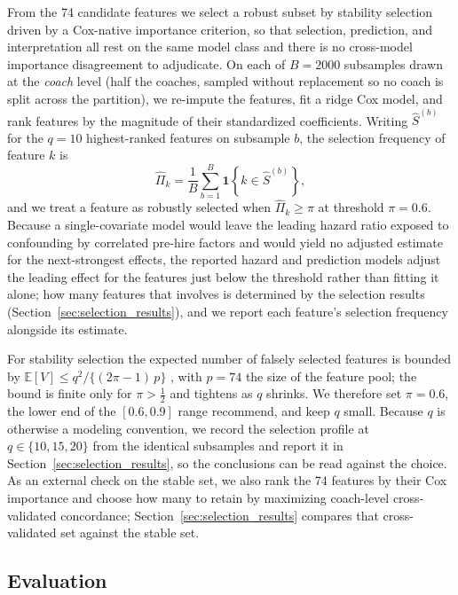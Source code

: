 \documentclass[USenglish]{article}
\theoremstyle{dgthm}
\theoremstyle{dgdef}
\begin{document}
From the 74 candidate features we select a robust subset by stability selection \citep{meinshausen2010} driven by a Cox-native importance criterion, so that selection, prediction, and interpretation all rest on the same model class and there is no cross-model importance disagreement to adjudicate. On each of $B = 2000$ subsamples drawn at the \emph{coach} level (half the coaches, sampled without replacement so no coach is split across the partition), we re-impute the features, fit a ridge Cox model, and rank features by the magnitude of their standardized coefficients. Writing $\hat{S}^{(b)}$ for the $q = 10$ highest-ranked features on subsample $b$, the selection frequency of feature $k$ is
\begin{equation}
\hat{\Pi}_k = \frac{1}{B}\sum_{b=1}^{B} \mathbf{1}\!\left\{k \in \hat{S}^{(b)}\right\},
\label{eq:stability}
\end{equation}
and we treat a feature as robustly selected when $\hat{\Pi}_k \geq \pi$ at threshold $\pi = 0.6$. Because a single-covariate model would leave the leading hazard ratio exposed to confounding by correlated pre-hire factors and would yield no adjusted estimate for the next-strongest effects, the reported hazard and prediction models adjust the leading effect for the features just below the threshold rather than fitting it alone; how many features that involves is determined by the selection results (Section~\ref{sec:selection_results}), and we report each feature's selection frequency alongside its estimate.

For stability selection the expected number of falsely selected features is bounded by $\mathbb{E}[V] \leq q^2 / \{(2\pi - 1)\,p\}$ \citep{meinshausen2010}, with $p = 74$ the size of the feature pool; the bound is finite only for $\pi > \tfrac{1}{2}$ and tightens as $q$ shrinks. We therefore set $\pi = 0.6$, the lower end of the $[0.6, 0.9]$ range \citet{meinshausen2010} recommend, and keep $q$ small. Because $q$ is otherwise a modeling convention, we record the selection profile at $q \in \{10, 15, 20\}$ from the identical subsamples and report it in Section~\ref{sec:selection_results}, so the conclusions can be read against the choice. As an external check on the stable set, we also rank the 74 features by their Cox importance and choose how many to retain by maximizing coach-level cross-validated concordance; Section~\ref{sec:selection_results} compares that cross-validated set against the stable set.

\subsection{Evaluation}
\label{sec:eval}
\end{document}
